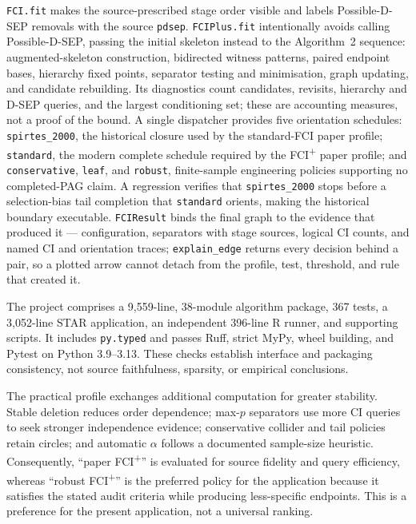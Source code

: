\documentclass[11pt,a4paper]{article}
\theoremstyle{definition}
\newcommand{\FCIplus}{FCI\textsuperscript{+}}
\newcommand{\code}[1]{\texttt{#1}}
\begin{document}
\code{FCI.fit} makes the source-prescribed stage order visible and labels
Possible-D-SEP removals with the source \code{pdsep}.
\code{FCIPlus.fit} intentionally avoids calling Possible-D-SEP, passing the
initial skeleton instead to the Algorithm~2 sequence: augmented-skeleton
construction, bidirected witness patterns, paired endpoint bases, hierarchy
fixed points, separator testing and minimisation, graph updating, and
candidate rebuilding. Its diagnostics count candidates, revisits, hierarchy
and D-SEP queries, and the largest conditioning set; these are accounting
measures, not a proof of the bound. A single dispatcher provides
five orientation schedules: \code{spirtes\_2000}, the historical closure
used by the standard-FCI paper profile; \code{standard}, the modern complete
schedule required by the \FCIplus{} paper profile; and \code{conservative},
\code{leaf}, and \code{robust}, finite-sample engineering policies
supporting no completed-PAG claim. A regression verifies that
\code{spirtes\_2000} stops before a selection-bias tail completion that
\code{standard} orients, making the historical boundary executable.
\code{FCIResult} binds the final graph to the evidence that produced it ---
configuration, separators with stage sources, logical CI counts, and named
CI and orientation traces; \code{explain\_edge} returns every decision
behind a pair, so a plotted arrow cannot detach from the profile, test,
threshold, and rule that created it.

The project comprises a 9,559-line, 38-module algorithm package, 367 tests,
a 3,052-line STAR application, an independent 396-line R runner, and
supporting scripts. It includes \code{py.typed} and passes Ruff, strict MyPy,
wheel building, and Pytest on Python 3.9--3.13. These checks establish
interface and packaging consistency, not source faithfulness, sparsity, or
empirical conclusions.

The practical profile exchanges additional computation for greater stability.
Stable deletion reduces order dependence; max-\(p\) separators use more CI
queries to seek stronger independence evidence; conservative collider and
tail policies retain circles; and automatic \(\alpha\) follows a documented
sample-size heuristic. Consequently, ``paper \FCIplus{}'' is evaluated for
source fidelity and query efficiency, whereas ``robust \FCIplus{}'' is the
preferred policy for the application because it satisfies the stated audit
criteria while producing less-specific endpoints. This is a preference for
the present application, not a universal ranking.
\end{document}

